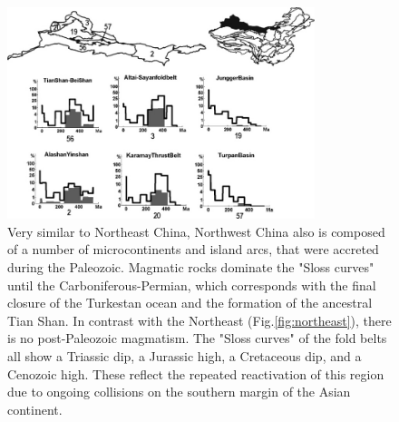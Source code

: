 \documentclass{article}
\begin{document}
 \begin{figure}[here]
 \begin{center}
 \includegraphics[width=0.8\textwidth]{northwesttris.jpg}
 \caption{
 Very similar to Northeast China,  Northwest China also is composed of
 a  number of  microcontinents  and island  arcs,  that were  accreted
 during  the Paleozoic.   Magmatic rocks  dominate the  "Sloss curves"
 until  the Carboniferous-Permian,  which corresponds  with  the final
 closure of  the Turkestan  ocean and the  formation of  the ancestral
 Tian Shan. In  contrast with the Northeast (Fig.\ref{fig:northeast}),
 there is no post-Paleozoic magmatism.  The "Sloss curves" of the fold
 belts all show a Triassic dip, a Jurassic high, a Cretaceous dip, and
 a  Cenozoic high.  These reflect  the repeated  reactivation  of this
 region due to ongoing collisions  on the southern margin of the Asian
 continent.  }\label{fig:northwest}
 \end{center}
 \end{figure}
\end{document}
